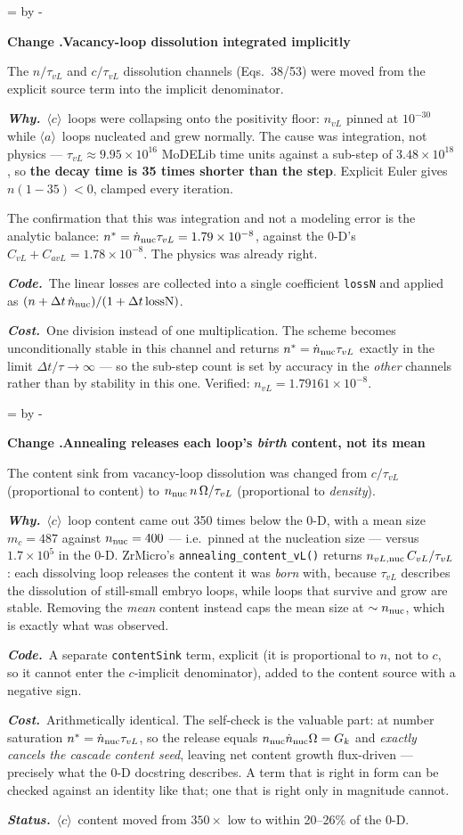 \documentclass[11pt,a4paper]{article}
\newcommand{\code}[1]{\texttt{\small #1}}
\newcommand{\aloop}{\ensuremath{\langle a\rangle}}
\newcommand{\cloop}{\ensuremath{\langle c\rangle}}
\newcommand{\Om}{\ensuremath{\Omega}}
\newcommand{\needlines}[1]{%
  \par\dimen0=\pagegoal \advance\dimen0 by -\pagetotal
  \ifdim\dimen0<#1\baselineskip \newpage \fi}
\newcounter{chg}
\newcommand{\change}[1]{%
  \needlines{4}%
  \refstepcounter{chg}%
  \par\medskip\noindent
  {\bfseries\boldmath Change \thechg.\quad #1}%
  \par\nobreak\smallskip}
\newcommand{\why}[1]{\par\noindent\textbf{\itshape Why.}\ #1\par}
\newcommand{\impact}[1]{\par\noindent\textbf{\itshape Code.}\ #1\par}
\newcommand{\cost}[1]{\par\noindent\textbf{\itshape Cost.}\ #1\par}
\newcommand{\status}[1]{\par\noindent\textbf{\itshape Status.}\ #1\par}
\begin{document}
\change{Vacancy-loop dissolution integrated implicitly}
\label{chg:anneal-implicit}
The $n/\tau_{vL}$ and $c/\tau_{vL}$ dissolution channels (Eqs.~38/53) were
moved from the explicit source term into the implicit denominator.
\why{\cloop\ loops were collapsing onto the positivity floor: $n_{vL}$ pinned
at $10^{-30}$ while \aloop\ loops nucleated and grew normally. The cause was
integration, not physics --- $\tau_{vL}\approx9.95\times10^{16}$ MoDELib time
units against a sub-step of $3.48\times10^{18}$, so \textbf{the decay time is
35 times shorter than the step}. Explicit Euler gives $n(1-35)<0$, clamped
every iteration.

The confirmation that this was integration and not a modeling error is the
analytic balance: $n^* = \dot n_{\rm nuc}\tau_{vL} = 1.79\times10^{-8}$,
against the 0-D's $C_{vL}+C_{avL} = 1.78\times10^{-8}$. The physics was
already right.}
\impact{The linear losses are collected into a single coefficient
\code{lossN} and applied as $(n + \Delta t\,\dot n_{\rm nuc})/(1+\Delta t\,
\text{lossN})$.}
\cost{One division instead of one multiplication. The scheme becomes
unconditionally stable in this channel and returns $n^* = \dot n_{\rm nuc}
\tau_{vL}$ exactly in the limit $\Delta t/\tau \rightarrow \infty$ --- so the
sub-step count is set by accuracy in the \emph{other} channels rather than by
stability in this one. Verified: $n_{vL} = 1.79161\times10^{-8}$.}

\change{Annealing releases each loop's \emph{birth} content, not its mean}
\label{chg:anneal-content}
The content sink from vacancy-loop dissolution was changed from $c/\tau_{vL}$
(proportional to content) to $n_{\rm nuc}\,n\,\Om/\tau_{vL}$ (proportional to
\emph{density}).
\why{\cloop\ loop content came out 350 times below the 0-D, with a mean size
$m_c = 487$ against $n_{\rm nuc} = 400$ --- i.e.\ pinned at the nucleation
size --- versus $1.7\times10^{5}$ in the 0-D. ZrMicro's
\code{annealing\_content\_vL()} returns $n_{vL,{\rm nuc}}\,C_{vL}/\tau_{vL}$:
each dissolving loop releases the content it was \emph{born} with, because
$\tau_{vL}$ describes the dissolution of still-small embryo loops, while loops
that survive and grow are stable. Removing the \emph{mean} content instead
caps the mean size at $\sim n_{\rm nuc}$, which is exactly what was observed.}
\impact{A separate \code{contentSink} term, explicit (it is proportional to
$n$, not to $c$, so it cannot enter the $c$-implicit denominator), added to the
content source with a negative sign.}
\cost{Arithmetically identical. The self-check is the valuable part: at number
saturation $n^* = \dot n_{\rm nuc}\tau_{vL}$, so the release equals
$n_{\rm nuc}\dot n_{\rm nuc}\Om = G_k$ and \emph{exactly cancels the cascade
content seed}, leaving net content growth flux-driven --- precisely what the
0-D docstring describes. A term that is right in form can be checked against
an identity like that; one that is right only in magnitude cannot.}
\status{\cloop\ content moved from $350\times$ low to within 20--26\% of the
0-D.}
\end{document}

